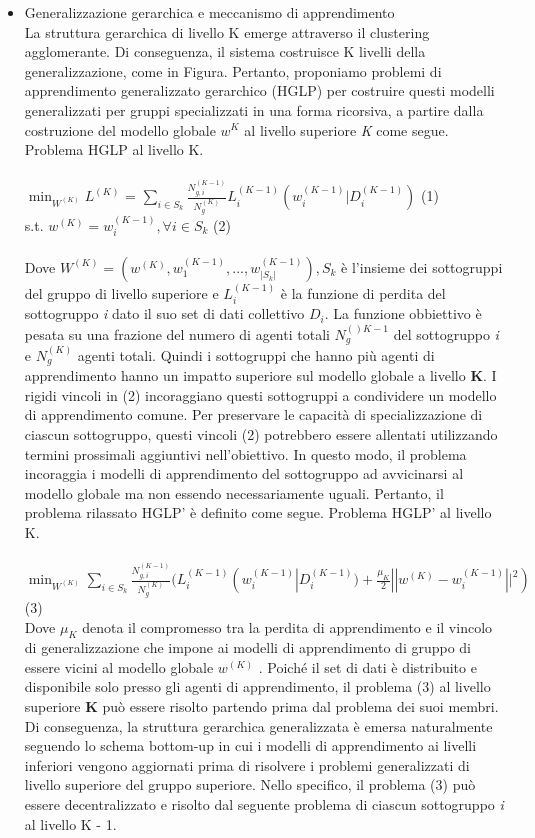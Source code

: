 \begin{itemize}
\item Generalizzazione gerarchica e meccanismo di apprendimento\\

La struttura gerarchica di livello K emerge attraverso il clustering agglomerante. Di conseguenza, il sistema costruisce K livelli della generalizzazione, come in Figura. Pertanto, proponiamo problemi di apprendimento generalizzato gerarchico (HGLP) per costruire questi modelli generalizzati per gruppi specializzati in una forma ricorsiva, a partire dalla costruzione del modello globale $w^K$ al livello superiore \textsl{K} come segue. \\
Problema HGLP al livello K. \\\\
$\min_{W^{(K)}}L^{(K)}$ = $\sum_{i\in S_k} \frac{N_{g,i}^{(K-1)}}{N_g^{(K)}}L_i^{(K-1)}(w_i^{(K-1)}|D_i^{(K-1)})$ \hspace{2cm} (1)\\
s.t. $w^{(K)}=w_i^{(K-1)}, \forall i \in S_k$ \hspace{5cm} (2)\\
\\
Dove $W^{(K)}=(w^{(K)},w_1^{(K-1)},...,w_{|S_k|}^{(K-1)}), S_k$ è l'insieme dei sottogruppi del gruppo di livello superiore e $L_i^{(K-1)}$ è la funzione di perdita del sottogruppo \textsl{i} dato il suo set di dati collettivo $D_i$. La funzione obbiettivo è pesata su una frazione del numero di agenti totali $N_g^{()K-1}$ del sottogruppo \textsl{i} e $N_g^{(K)}$ agenti totali. Quindi i sottogruppi che hanno più agenti di apprendimento hanno un impatto superiore sul modello globale a livello \textbf{K}. I rigidi vincoli in (2) incoraggiano questi sottogruppi a condividere un modello di apprendimento comune. Per preservare le capacità di specializzazione di ciascun sottogruppo, questi vincoli (2) potrebbero essere allentati utilizzando termini prossimali aggiuntivi nell'obiettivo.
In questo modo, il problema incoraggia i modelli di apprendimento del sottogruppo ad avvicinarsi al modello globale ma non essendo necessariamente uguali. Pertanto, il problema rilassato HGLP' è definito come segue.
Problema HGLP' al livello K.\\\\
$\min_{W^{(K)}}\sum_{i\in S_k} \frac{N_{g,i}^{(K-1)}}{N_g^{(K)}}(L_i^{(K-1)}(w_i^{(K-1)}|D_i^{(K-1)}) +\frac{\mu_K}{2}||w^{(K)}-w_i^{(K-1)}||^2) $ \hspace{1cm} (3)\\
Dove $\mu_K$ denota il compromesso tra la perdita di apprendimento e il vincolo di generalizzazione che impone ai modelli di apprendimento di gruppo di essere vicini al modello globale $w^{(K)}$ . Poiché il set di dati è distribuito e disponibile solo presso gli agenti di apprendimento, il problema (3) al livello superiore \textbf{K} può essere risolto partendo prima dal problema dei suoi membri. Di conseguenza, la struttura gerarchica generalizzata è emersa naturalmente seguendo lo schema bottom-up in cui i modelli di apprendimento ai livelli inferiori vengono aggiornati prima di risolvere i problemi generalizzati di livello superiore del gruppo superiore. Nello specifico, il problema (3) può essere decentralizzato e risolto dal seguente problema di ciascun sottogruppo \textsl{i} al livello K - 1.

\end{itemize}
